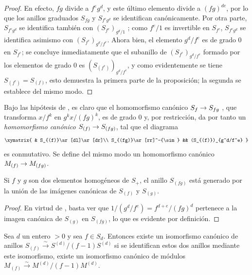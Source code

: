 \documentclass[oneside,10pt]{amsart}
\makeatletter
\newcommand{\ega@arrow}[2]{\mathchoice{#1}{#2}{#2}{#2}}
\renewcommand{\to}{\ega@arrow{\longrightarrow}{\rightarrow}}
\let\EGAOriginalLabel\label
\renewcommand{\label}[1]{\phantomsection\EGAOriginalLabel{#1}}
\makeatother
\begin{document}
\begin{proof}
En efecto, $fg$ divide a $f^e g^d$, y este último elemento divide a $(fg)^{de}$, por lo que los anillos graduados $S_{fg}$ y $S_{f^e g^d}$ se identifican canónicamente.
Por otra parte, $S_{f^e g^d}$ se identifica también con $(S_{f^e})_{g^d/1}$ ; como $f^e/1$ es invertible en $S_{f^e}$, $S_{f^e g^d}$ se identifica asimismo con $(S_{f^e})_{g^d/f^e}$.
Ahora bien, el elemento $g^d/f^e$ es de grado $0$ en $S_{f^e}$; se concluye inmediatamente que el subanillo de $(S_{f^e})_{g^d/f^e}$ formado por los elementos de grado $0$ es $(S_{(f^e)})_{g^d/f^e}$, y como evidentemente se tiene $S_{(f^e)}=S_{(f)}$, esto demuestra la primera parte de la proposición; la segunda se establece del mismo modo.
\end{proof}

\begin{env}[2.2.3]
\label{II.2.2.3-fr}
Bajo las hipótesis de , es claro que el homomorfismo canónico $S_f\to S_{fg}$ , que transforma $x/f^k$ en $g^k x/(fg)^k$, es de grado $0$ y, por restricción, da por tanto un \emph{homomorfismo canónico $S_{(f)}\to S_{(fg)}$}, tal que el diagrama
\[
  \xymatrix{
    & S_{(f)}\ar[dl]\ar[dr]\\
    S_{(fg)}\ar[rr]^-{\sim} && (S_{(f)})_{g^d/f^e}
  }
\]
es conmutativo.
Se define del mismo modo un homomorfismo canónico $M_{(f)}\to M_{(fg)}$.
\end{env}

\begin{lemma}[2.2.4]
\label{II.2.2.4-fr}
Si $f$ y $g$ son dos elementos homogéneos de $S_+$, el anillo $S_{(fg)}$ está generado por la unión de las imágenes canónicas de $S_{(f)}$ y $S_{(g)}$.
\end{lemma}

\begin{proof}
En virtud de , basta ver que
$1/(g^d/f^e)=f^{d+e}/(fg)^d$
pertenece a la imagen canónica de $S_{(g)}$ en $S_{(fg)}$, lo que es evidente por definición.
\end{proof}

\begin{proposition}[2.2.5]
\label{II.2.2.5-fr}
Sea $d$ un entero $>0$ y sea $f\in S_d$.
Entonces existe un isomorfismo canónico de anillos
$S_{(f)}\xrightarrow{\sim}S^{(d)}/(f-1)S^{(d)}$
si se identifican estos dos anillos mediante este isomorfismo, existe un isomorfismo canónico de módulos
$M_{(f)}\xrightarrow{\sim}M^{(d)}/(f-1)M^{(d)}$.
\end{proposition}
\end{document}
